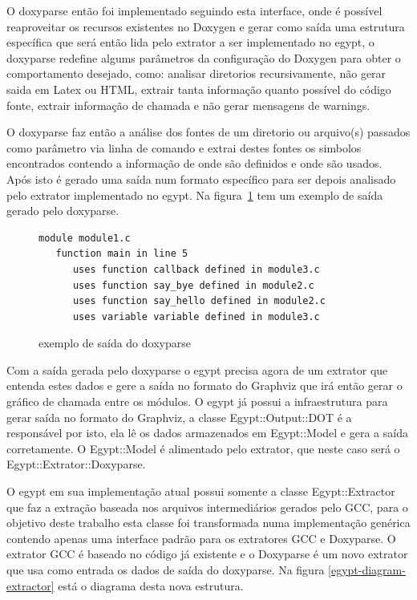 O doxyparse então foi implementado seguindo esta interface, onde é possível
reaproveitar os recursos existentes no Doxygen e gerar como saída uma estrutura
específica que será então lida pelo extrator a ser implementado no egypt, o
doxyparse redefine algums parâmetros da configuração do Doxygen para obter o
comportamento desejado, como: analisar diretorios recursivamente, não gerar
saida em Latex ou HTML, extrair tanta informação quanto possível do código
fonte, extrair informação de chamada e não gerar mensagens de warnings.

O doxyparse faz então a análise dos fontes de um diretorio ou arquivo(s)
passados como parâmetro via linha de comando e extrai destes fontes os simbolos
encontrados contendo a informação de onde são definidos e onde são usados. Após
isto é gerado uma saída num formato específico para ser depois analisado pelo
extrator implementado no egypt. Na figura~\ref{exemplo-saida-doxyparse} tem um
exemplo de saída gerado pelo doxyparse.

\begin{figure}[h]
\begin{Verbatim}[frame=single,fontsize=\relsize{-2},fontfamily=courier]
module module1.c
   function main in line 5
      uses function callback defined in module3.c
      uses function say_bye defined in module2.c
      uses function say_hello defined in module2.c
      uses variable variable defined in module3.c
\end{Verbatim}
\caption{exemplo de saída do doxyparse}
\label{exemplo-saida-doxyparse}
\end{figure}

Com a saída gerada pelo doxyparse o egypt precisa agora de um extrator que
entenda estes dados e gere a saída no formato do Graphviz que irá então gerar o
gráfico de chamada entre os módulos. O egypt já possui a infraestrutura
para gerar saída no formato do Graphviz, a classe Egypt::Output::DOT é a
responsável por isto, ela lê os dados armazenados em Egypt::Model e gera a
saída corretamente. O Egypt::Model é alimentado pelo extrator, que neste caso será
o Egypt::Extrator::Doxyparse.

O egypt em sua implementação atual possui somente a classe Egypt::Extractor que
faz a extração baseada nos arquivos intermediários gerados pelo GCC, para o
objetivo deste trabalho esta classe foi transformada numa implementação
genérica contendo apenas uma interface padrão para os extratores GCC e
Doxyparse. O extrator GCC é baseado no código já existente e o Doxyparse é um
novo extrator que usa como entrada os dados de saída do doxyparse. Na
figura \ref{egypt-diagram-extractor} está o diagrama desta nova estrutura.


